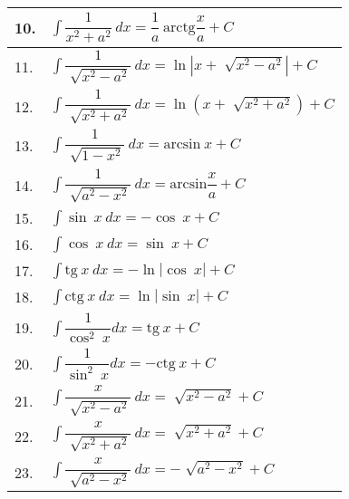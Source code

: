 \documentclass{article}
\begin{document}
\begin{table}[!ht]
\begin{minipage}{0.5\linewidth}
\begin{tabular}{|m{1cm}|m{6.5cm}|}
      \hline
      10.          & $\displaystyle\int \dfrac{1}{x^2+a^2}\ dx = \dfrac{1}{a}\ \text{arctg} \dfrac{x}{a} + C $                     \\
      \hline
      11.          & $\displaystyle\int \dfrac{1}{\sqrt[]{x^2-a^2}}\ dx = \ln \left\lvert x + \sqrt[]{x^2-a^2} \right\rvert + C $  \\
      \hline
      12.          & $\displaystyle\int \dfrac{1}{\sqrt[]{x^2+a^2}}\ dx = \ln \left( x+\sqrt[]{x^2+a^2} \right) + C $              \\
      \hline
      13.          & $\displaystyle\int \dfrac{1}{\sqrt[]{1-x^2}}\ dx = \text{arcsin}\ x + C $                                     \\
      \hline
      14.          & $\displaystyle\int \dfrac{1}{\sqrt[]{a^2-x^2}}\ dx = \text{arcsin} \dfrac{x}{a} + C $                         \\
      \hline
      15.          & $\displaystyle\int \sin\ x\ dx = -\cos\ x + C $                                                               \\
      \hline
      16.          & $\displaystyle\int \cos\ x\ dx = \sin\ x + C $                                                                \\
      \hline
      17.          & $\displaystyle\int \text{tg}\ x\ dx = -\ln\left\lvert \cos\ x \right\rvert + C $                              \\
      \hline
      18.          & $\displaystyle\int \text{ctg}\ x\ dx = \ln \left\lvert \sin\ x\right\rvert + C $                              \\
      \hline
      19.          & $\displaystyle\int \dfrac{1}{\cos ^2\ x} dx = \text{tg}\ x + C $                                              \\
      \hline
      20.          & $\displaystyle\int \dfrac{1}{\sin ^2\ x} dx = -\text{ctg}\ x + C $                                            \\
      \hline
      21.          & $\displaystyle\int \dfrac{x}{\sqrt[]{x^2-a^2}}\ dx = \sqrt[]{x^2 - a^2} + C $                                 \\
      \hline
      22.          & $\displaystyle\int \dfrac{x}{\sqrt[]{x^2+a^2}}\ dx = \sqrt[]{x^2 + a^2} + C $                                 \\
      \hline
      23.          & $\displaystyle\int \dfrac{x}{\sqrt[]{a^2-x^2}}\ dx = -\sqrt[]{a^2 - x^2} + C $                                \\
      \hline
    \end{tabular}
  \end{minipage}
\end{table}
\end{document}
